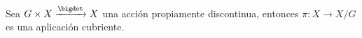 \begin{ejercicio}
    Sea $G\times X\xrightarrow{\bigdot} X$ una acción propiamente discontinua, entonces $\pi:X\to X/G$ es una aplicación cubriente.
\end{ejercicio}

\begin{demostracion}

\end{demostracion}
